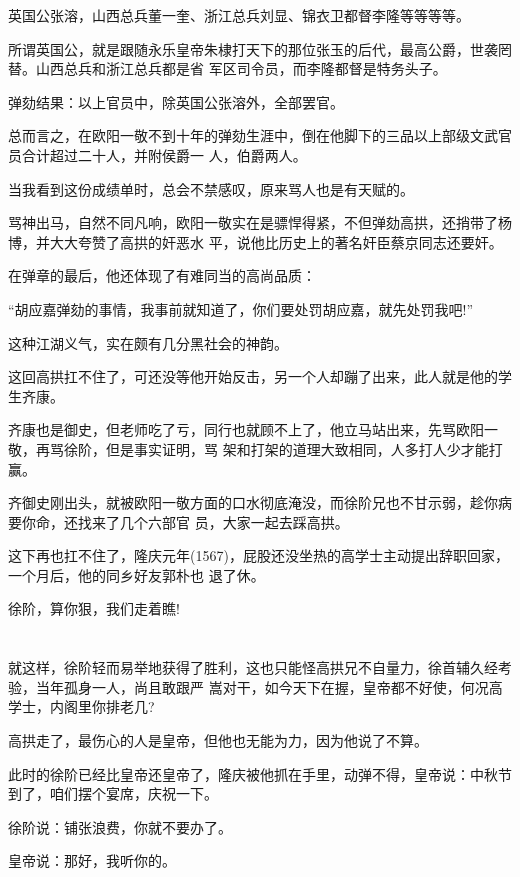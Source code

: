 \documentclass[11pt,a4paper,onecolumn]{article}
\begin{document}
英国公张溶，山西总兵董一奎、浙江总兵刘显、锦衣卫都督李隆等等等等。

所谓英国公，就是跟随永乐皇帝朱棣打天下的那位张玉的后代，最高公爵，世袭罔替。山西总兵和浙江总兵都是省
军区司令员，而李隆都督是特务头子。

弹劾结果：以上官员中，除英国公张溶外，全部罢官。

总而言之，在欧阳一敬不到十年的弹劾生涯中，倒在他脚下的三品以上部级文武官员合计超过二十人，并附侯爵一
人，伯爵两人。

当我看到这份成绩单时，总会不禁感叹，原来骂人也是有天赋的。

骂神出马，自然不同凡响，欧阳一敬实在是骠悍得紧，不但弹劾高拱，还捎带了杨博，并大大夸赞了高拱的奸恶水
平，说他比历史上的著名奸臣蔡京同志还要奸。

在弹章的最后，他还体现了有难同当的高尚品质：

``胡应嘉弹劾的事情，我事前就知道了，你们要处罚胡应嘉，就先处罚我吧!''

这种江湖义气，实在颇有几分黑社会的神韵。

这回高拱扛不住了，可还没等他开始反击，另一个人却蹦了出来，此人就是他的学生齐康。

齐康也是御史，但老师吃了亏，同行也就顾不上了，他立马站出来，先骂欧阳一敬，再骂徐阶，但是事实证明，骂
架和打架的道理大致相同，人多打人少才能打赢。

齐御史刚出头，就被欧阳一敬方面的口水彻底淹没，而徐阶兄也不甘示弱，趁你病要你命，还找来了几个六部官
员，大家一起去踩高拱。

这下再也扛不住了，隆庆元年(1567)，屁股还没坐热的高学士主动提出辞职回家，一个月后，他的同乡好友郭朴也
退了休。

徐阶，算你狠，我们走着瞧!

\section[\thesection]{}

就这样，徐阶轻而易举地获得了胜利，这也只能怪高拱兄不自量力，徐首辅久经考验，当年孤身一人，尚且敢跟严
嵩对干，如今天下在握，皇帝都不好使，何况高学士，内阁里你排老几?

高拱走了，最伤心的人是皇帝，但他也无能为力，因为他说了不算。

此时的徐阶已经比皇帝还皇帝了，隆庆被他抓在手里，动弹不得，皇帝说：中秋节到了，咱们摆个宴席，庆祝一下。

徐阶说：铺张浪费，你就不要办了。

皇帝说：那好，我听你的。
\end{document}
